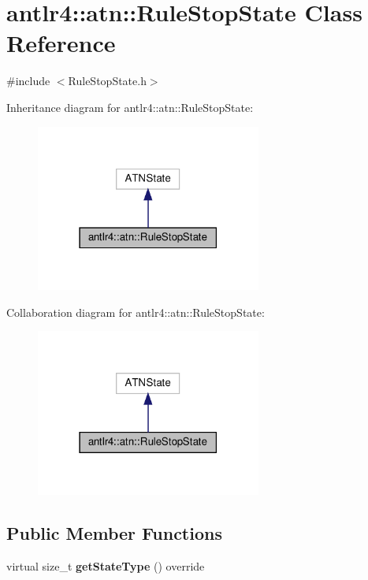 \hypertarget{classantlr4_1_1atn_1_1RuleStopState}{}\section{antlr4\+:\+:atn\+:\+:Rule\+Stop\+State Class Reference}
\label{classantlr4_1_1atn_1_1RuleStopState}


{\ttfamily \#include $<$Rule\+Stop\+State.\+h$>$}



Inheritance diagram for antlr4\+:\+:atn\+:\+:Rule\+Stop\+State\+:
\nopagebreak
\begin{figure}[H]
\begin{center}
\leavevmode
\includegraphics[width=210pt]{classantlr4_1_1atn_1_1RuleStopState__inherit__graph}
\end{center}
\end{figure}


Collaboration diagram for antlr4\+:\+:atn\+:\+:Rule\+Stop\+State\+:
\nopagebreak
\begin{figure}[H]
\begin{center}
\leavevmode
\includegraphics[width=210pt]{classantlr4_1_1atn_1_1RuleStopState__coll__graph}
\end{center}
\end{figure}
\subsection*{Public Member Functions}
\begin{DoxyCompactItemize}
\item 
\mbox{\label{classantlr4_1_1atn_1_1RuleStopState_a546f836312a3bb721a8d83d823dce2d9}} 
virtual size\+\_\+t {\bfseries get\+State\+Type} () override
\end{DoxyCompactItemize}


